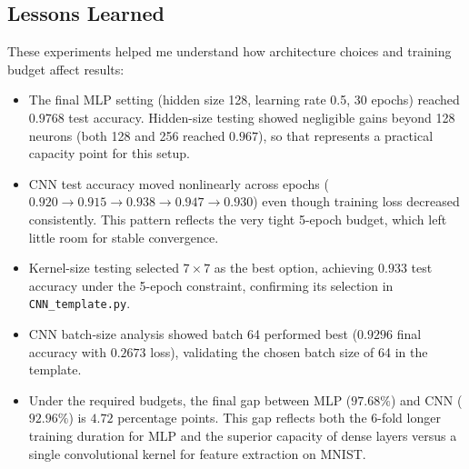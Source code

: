 \subsection{Lessons Learned}
These experiments helped me understand how architecture choices and training budget affect results:
\begin{itemize}
	\item The final MLP setting (hidden size 128, learning rate 0.5, 30 epochs) reached $0.9768$ test accuracy. Hidden-size testing showed negligible gains beyond 128 neurons (both 128 and 256 reached $0.967$), so that represents a practical capacity point for this setup.
	\item CNN test accuracy moved nonlinearly across epochs ($0.920 \rightarrow 0.915 \rightarrow 0.938 \rightarrow 0.947 \rightarrow 0.930$) even though training loss decreased consistently. This pattern reflects the very tight 5-epoch budget, which left little room for stable convergence.
	\item Kernel-size testing selected $7\times 7$ as the best option, achieving $0.933$ test accuracy under the 5-epoch constraint, confirming its selection in \texttt{CNN\_template.py}.
	\item CNN batch-size analysis showed batch 64 performed best ($0.9296$ final accuracy with $0.2673$ loss), validating the chosen batch size of 64 in the template.
	\item Under the required budgets, the final gap between MLP ($97.68\%$) and CNN ($92.96\%$) is $4.72$ percentage points. This gap reflects both the 6-fold longer training duration for MLP and the superior capacity of dense layers versus a single convolutional kernel for feature extraction on MNIST.
\end{itemize}
